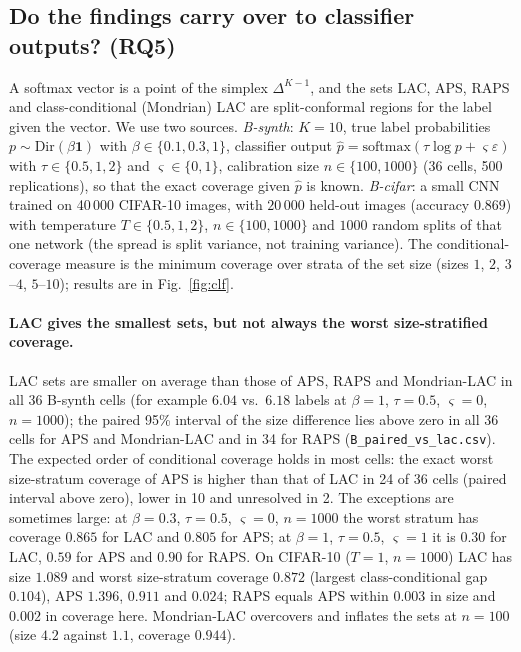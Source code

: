 \subsection{Do the findings carry over to classifier outputs? (RQ5)}
\label{sec:exp_clf}
A softmax vector is a point of the simplex $\Delta^{K-1}$, and the sets LAC, APS, RAPS and class-conditional (Mondrian) LAC are split-conformal regions for the label given the vector.
We use two sources.
\emph{B-synth}: $K=10$, true label probabilities $p\sim\mathrm{Dir}(\beta\mathbf 1)$ with $\beta\in\{0.1,0.3,1\}$, classifier output $\hat p=\mathrm{softmax}(\tau\log p+\varsigma\varepsilon)$ with $\tau\in\{0.5,1,2\}$ and $\varsigma\in\{0,1\}$, calibration size $n\in\{100,1000\}$ (36 cells, 500 replications), so that the exact coverage given $\hat p$ is known.
\emph{B-cifar}: a small CNN trained on 40\,000 CIFAR-10 images, with $20\,000$ held-out images (accuracy $0.869$) with temperature $T\in\{0.5,1,2\}$, $n\in\{100,1000\}$ and $1000$ random splits of that one network (the spread is split variance, not training variance).
The conditional-coverage measure is the minimum coverage over strata of the set size (sizes $1$, $2$, $3$--$4$, $5$--$10$); results are in Fig.~\ref{fig:clf}.

\paragraph{LAC gives the smallest sets, but not always the worst size-stratified coverage.}
LAC sets are smaller on average than those of APS, RAPS and Mondrian-LAC in all 36 B-synth cells (for example $6.04$ vs.\ $6.18$ labels at $\beta=1$, $\tau=0.5$, $\varsigma=0$, $n=1000$); the paired 95\% interval of the size difference lies above zero in all 36 cells for APS and Mondrian-LAC and in 34 for RAPS (\texttt{B\_paired\_vs\_lac.csv}).
The expected order of conditional coverage holds in most cells: the exact worst size-stratum coverage of APS is higher than that of LAC in 24 of 36 cells (paired interval above zero), lower in 10 and unresolved in 2.
The exceptions are sometimes large: at $\beta=0.3$, $\tau=0.5$, $\varsigma=0$, $n=1000$ the worst stratum has coverage $0.865$ for LAC and $0.805$ for APS; at $\beta=1$, $\tau=0.5$, $\varsigma=1$ it is $0.30$ for LAC, $0.59$ for APS and $0.90$ for RAPS.
On CIFAR-10 ($T=1$, $n=1000$) LAC has size $1.089$ and worst size-stratum coverage $0.872$ (largest class-conditional gap $0.104$), APS $1.396$, $0.911$ and $0.024$; RAPS equals APS within $0.003$ in size and $0.002$ in coverage here.
Mondrian-LAC overcovers and inflates the sets at $n=100$ (size $4.2$ against $1.1$, coverage $0.944$).

